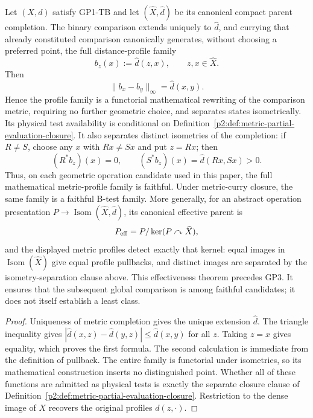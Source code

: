 \documentclass[12pt,a4paper]{article}
\begin{document}
\begin{theorem}
\label{p2:thm:canonical-metric-profile-separation}
Let \((X,d)\) satisfy GP1-TB and let
\((\widehat X,\widehat d)\) be its canonical compact parent completion.  The binary
comparison extends uniquely to \(\widehat d\), and currying that already
constituted comparison canonically generates, without choosing a preferred
point, the full distance-profile family
\[
        b_z(x):=\widehat d(z,x),\qquad z,x\in\widehat X.
\]
Then
\[
 \lVert b_x-b_y\rVert_\infty=\widehat d(x,y).
\]
Hence the profile family is a functorial mathematical rewriting of the
comparison metric, requiring no further geometric choice, and separates
states isometrically.  Its physical test availability is conditional on
Definition~\ref{p2:def:metric-partial-evaluation-closure}.  It also separates
distinct isometries of the completion: if
\(R\ne S\), choose any \(x\) with \(Rx\ne Sx\) and put
\(z=Rx\); then
\[
        (R^*b_z)(x)=0,
        \qquad
        (S^*b_z)(x)=\widehat d(Rx,Sx)>0.
\]
Thus, on each geometric operation candidate used in this paper, the full
mathematical metric-profile family is faithful.  Under metric-curry closure,
the same family is a faithful B-test family.  More generally, for an abstract operation
presentation
\(P\to\operatorname{Isom}(\widehat X,\widehat d)\), its canonical effective parent
is
\[
 P_{\rm eff}=P/\ker(P\curvearrowright\widehat X),
\]
and the displayed metric profiles detect exactly that kernel: equal images in
\(\operatorname{Isom}(\widehat X)\) give equal profile pullbacks, and distinct
images are separated by the isometry-separation clause above.  This
effectiveness theorem precedes GP3.  It ensures that the subsequent global comparison is among faithful candidates;
it does not itself establish a least class.
\end{theorem}

\begin{proof}
Uniqueness of metric completion gives the unique extension \(\widehat d\).
The triangle inequality gives
\(|\widehat d(x,z)-\widehat d(y,z)|\le\widehat d(x,y)\) for all \(z\).
Taking \(z=x\) gives equality,
which proves the first formula.  The second calculation is immediate from the
definition of pullback.  The entire family is functorial under isometries, so
its mathematical construction inserts no distinguished point.  Whether all
of these functions are admitted as physical tests is exactly the separate
closure clause of
Definition~\ref{p2:def:metric-partial-evaluation-closure}.  Restriction to
the dense image of \(X\) recovers the original profiles \(d(z,\cdot)\).
\end{proof}
\end{document}

